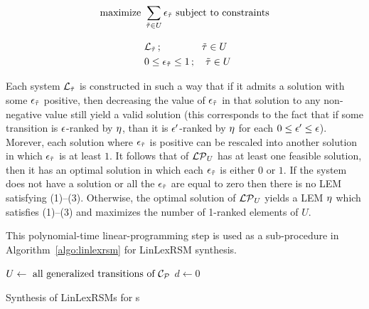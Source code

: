   \begin{align*}
\text{maximize }  &\sum_{\tilde{\tau} \in U} \epsilon_{\tilde\tau} \text{ subject to constraints}\\[0.3cm]
&\mathcal{L}_{\tilde{\tau}}\,;\quad\quad \quad\quad\tilde{\tau}\in U\\
&0 \leq \epsilon_{\tilde{\tau}} \leq 1\,; \quad \tilde{\tau}\in U
  \end{align*}
  
Each system $\mathcal{L}_{\tilde{\tau}}$ is constructed in such a way that if it admits a solution with some $\epsilon_{\tilde{\tau}}$ positive, then decreasing the value of $\epsilon_{\tilde{\tau}}$ in that solution to any non-negative value still yield a valid solution (this corresponds to the fact that if some transition is $\epsilon$-ranked by $\eta$, than it is $\epsilon'$-ranked by $\eta$ for each $0\leq \epsilon'\leq \epsilon$). Morever, each solution where $\epsilon_{\tilde{\tau}}$ is positive can be rescaled into another solution in which $\epsilon_{\tilde{\tau}}$ is at least $1$. It follows that of $\mathcal{LP}_{U}$ has at least one feasible solution, then it has an optimal solution in which each $\epsilon_{\tilde{\tau}}$ is either $0$ or $1$. If the system does not have a solution or all the $\epsilon_{\tilde{\tau}}$ are equal to zero then there is no LEM satisfying (1)--(3). Otherwise, the optimal solution of $\mathcal{LP}_{U}$ yields a LEM $\eta$ which satisfies (1)--(3) and maximizes the number of 1-ranked elements of $U$.

This polynomial-time linear-programming step is used as a sub-procedure in Algorithm~\ref{algo:linlexrsm} for LinLexRSM synthesis. 

\begin{algorithm}
\DontPrintSemicolon

$U \leftarrow \text{ all generalized transitions of } \mathcal{C}_{\mathcal{P}}$\;
$d\leftarrow 0$\;
\caption{Synthesis of LinLexRSMs for \APP{}s}
\label{algo:linlexrsm}
\end{algorithm}

